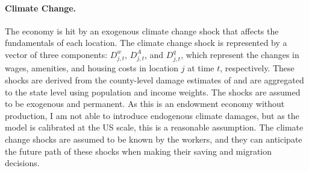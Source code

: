 \documentclass[12pt, a4paper]{article}
\begin{document}
\paragraph{Climate Change.} The economy is hit by an exogenous climate change shock that affects the fundamentals of each location. The climate change shock is represented by a vector of three components: $D^w_{j,t}$, $D^A_{j,t}$, and $D^q_{j,t}$, which represent the changes in wages, amenities, and housing costs in location $j$ at time $t$, respectively. These shocks are derived from the county-level damage estimates of \citet{hsiang_estimating_2017} and are aggregated to the state level using population and income weights. The shocks are assumed to be exogenous and permanent. As this is an endowment economy without production, I am not able to introduce endogenous climate damages, but as the model is calibrated at the US scale, this is a reasonable assumption. The climate change shocks are assumed to be known by the workers, and they can anticipate the future path of these shocks when making their saving and migration decisions.
\end{document}
